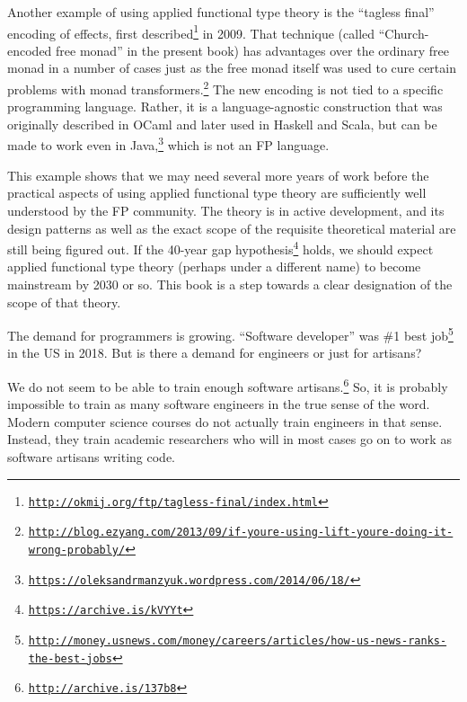 Another example of using applied functional type theory is the  \textsf{``}tagless
final\textsf{''} encoding of effects, first described\footnote{\texttt{\href{http://okmij.org/ftp/tagless-final/index.html}{http://okmij.org/ftp/tagless-final/index.html}}}
in 2009. That technique (called \textsf{``}Church-encoded free monad\textsf{''}
in the present book) has advantages over the ordinary free monad in
a number of cases \textemdash{} just as the free monad itself was
used to cure certain problems with monad transformers.\footnote{\texttt{\href{http://blog.ezyang.com/2013/09/if-youre-using-lift-youre-doing-it-wrong-probably/}{http://blog.ezyang.com/2013/09/if-youre-using-lift-youre-doing-it-wrong-probably/}}}
The new encoding is not tied to a specific programming language. Rather,
it is a language-agnostic construction that was originally described
in OCaml and later used in Haskell and Scala, but can be made to work
even in Java,\footnote{\texttt{\href{https://oleksandrmanzyuk.wordpress.com/2014/06/18/}{https://oleksandrmanzyuk.wordpress.com/2014/06/18/}}}
which is not an FP language.

This example shows that we may need several more years of work before
the practical aspects of using applied functional type theory are
sufficiently well understood by the FP community. The theory is in
active development, and its design patterns \textemdash{} as well
as the exact scope of the requisite theoretical material \textemdash{}
are still being figured out. If the 40-year gap hypothesis\footnote{\texttt{\href{https://www.linkedin.com/pulse/40-year-gap-what-has-academic-computer-science-ever-done-winitzki}{https://archive.is/kVYYt}}}
holds, we should expect applied functional type theory (perhaps under
a different name) to become mainstream by 2030 or so. This book is
a step towards a clear designation of the scope of that theory.


The demand for programmers is growing. \textsf{``}Software developer\textsf{''} was
\#1 best job\footnote{\texttt{\href{http://money.usnews.com/money/careers/articles/how-us-news-ranks-the-best-jobs}{http://money.usnews.com/money/careers/articles/how-us-news-ranks-the-best-jobs}}}
in the US in 2018. But is there a demand for engineers or just for
artisans?

We do not seem to be able to train enough software artisans.\footnote{\texttt{\href{http://archive.is/137b8}{http://archive.is/137b8}}}
So, it is probably impossible to train as many software engineers
in the true sense of the word. Modern computer science courses do
not actually train engineers in that sense. Instead, they train academic
researchers who will in most cases go on to work as software artisans
writing code.

